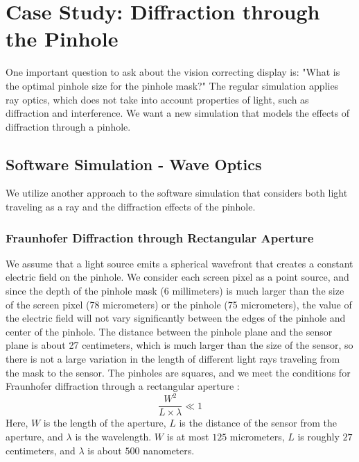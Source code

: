 \chapter{Case Study: Diffraction through the Pinhole}


One important question to ask about the vision correcting display is: "What is the optimal pinhole size for the pinhole mask?" The regular simulation applies ray optics, which does not take into account properties of light, such as diffraction and interference. We want a new simulation that models the effects of diffraction through a pinhole.

\section{Software Simulation - Wave Optics}

We utilize another approach to the software simulation that considers both light traveling as a ray and the diffraction effects of the pinhole. 

\subsection{Fraunhofer Diffraction through Rectangular Aperture}
\noindent We assume that a light source emits a spherical wavefront that creates a constant electric field on the pinhole. We consider each screen pixel as a point source, and since the depth of the pinhole mask (6 millimeters) is much larger than the size of the screen pixel (78 micrometers) or the pinhole (75 micrometers), the value of the electric field will not vary significantly between the edges of the pinhole and center of the pinhole. The distance between the pinhole plane and the sensor plane is about 27 centimeters, which is much larger than the size of the sensor, so there is not a large variation in the length of different light rays traveling from the mask to the sensor. The pinholes are squares, and we meet the conditions for Fraunhofer diffraction through a rectangular aperture \cite{Lipson:1987:OpticalPhysics}: 
$$\frac{W^2}{L \times \lambda} \ll 1$$
Here, $W$ is the length of the aperture, $L$ is the distance of the sensor from the aperture, and $\lambda$ is the wavelength. $W$ is at most $125$ micrometers, $L$ is roughly $27$ centimeters, and $\lambda$ is about $500$ nanometers. 

